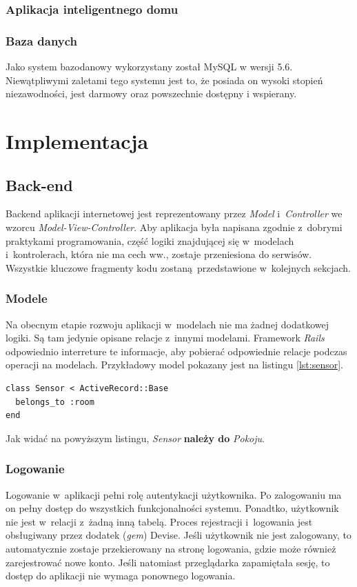 \documentclass[eng,oneside]{mgr}
\begin{document}
\subsection{Aplikacja inteligentnego domu} %
\label{sub:aplikacja_inteligentnego_domu}


\subsection{Baza danych}
Jako system bazodanowy wykorzystany został MySQL w wersji 5.6. Niewątpliwymi zaletami tego systemu jest to, że posiada on wysoki stopień niezawodności, jest darmowy oraz powszechnie dostępny i wspierany.


\chapter{Implementacja} %
\label{cha:implementacja}
\section{Back-end} %
\label{sec:back_end}
Backend aplikacji internetowej jest reprezentowany przez \emph{Model} i~\emph{Controller} we wzorcu \emph{Model-View-Controller}. Aby aplikacja była napisana zgodnie z~dobrymi praktykami programowania, część logiki znajdującej się w~modelach i~kontrolerach, która nie ma cech ww., zostaje przeniesiona do serwisów. Wszystkie kluczowe fragmenty kodu zostaną przedstawione w~kolejnych sekcjach.
\subsection{Modele} %
\label{sub:modele}
Na obecnym etapie rozwoju aplikacji w~modelach nie ma żadnej dodatkowej logiki. Są tam jedynie opisane relacje z~innymi modelami. Framework \emph{Rails} odpowiednio interreture te informacje, aby pobierać odpowiednie relacje podczas operacji na modelach. Przykładowy model pokazany jest na listingu \ref{lst:sensor}.
\begin{lstlisting}[caption={Model sensora.},label=lst:sensor]
class Sensor < ActiveRecord::Base
  belongs_to :room
end
\end{lstlisting}
Jak widać na powyższym listingu, \emph{Sensor} \textbf{należy do} \emph{Pokoju}.
\subsection{Logowanie} %
\label{sub:logowanie}
Logowanie w~aplikacji pełni rolę autentykacji użytkownika. Po zalogowaniu ma on pełny dostęp do wszystkich funkcjonalności systemu. Ponadtko, użytkownik nie jest w~relacji z~żadną inną tabelą. Proces rejestracji i~logowania jest obsługiwany przez dodatek (\emph{gem}) Devise. Jeśli użytkownik nie jest zalogowany, to automatycznie zostaje przekierowany na stronę logowania, gdzie może również zarejestrować nowe konto. Jeśli natomiast przeglądarka zapamiętała sesję, to dostęp do aplikacji nie wymaga ponownego logowania.
\end{document}
